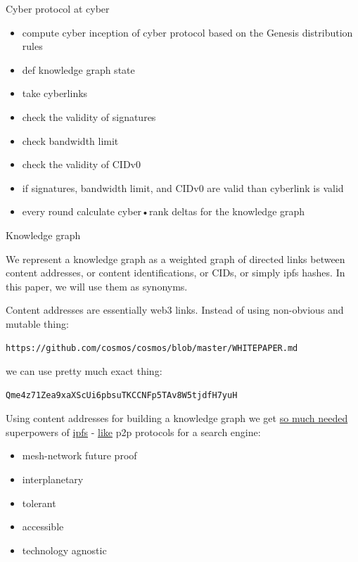 \documentclass[10pt,oneside]{amsart}
\makeatletter
\def\section{\@startsection{section}{1}%
  \z@{.7\linespacing\@plus\linespacing}{.5\linespacing}%
  {\normalfont\scshape}}%
\newenvironment{Figure}
  {\par\medskip\noindent\minipage{\linewidth}}
  {\endminipage\par\medskip}
\makeatother
\begin{document}
\section{Cyber protocol at cyber}\label{cyber protocol at cyber}

\begin{itemize}
\item compute cyber inception of cyber protocol based on the Genesis distribution rules
\item def knowledge graph state
\item take cyberlinks
\item check the validity of signatures
\item check bandwidth limit
\item check the validity of CIDv0
\item if signatures, bandwidth limit, and CIDv0 are valid than cyberlink is valid
\item every round calculate cyber•rank deltas for the knowledge graph
\end{itemize}

\section{Knowledge graph}\label{knowledge graph}
 
We represent a knowledge graph as a weighted graph of directed links between content addresses, or content identifications, or CIDs, or simply ipfs hashes. In this paper, we will use them as synonyms.


Content addresses are essentially web3 links. Instead of using non-obvious and mutable thing:
\begin{lstlisting}
https://github.com/cosmos/cosmos/blob/master/WHITEPAPER.md
\end{lstlisting}
we can use pretty much exact thing:
\begin{lstlisting}
Qme4z71Zea9xaXScUi6pbsuTKCCNFp5TAv8W5tjdfH7yuH
\end{lstlisting}
Using content addresses for building a knowledge graph we get 
\href{https://steemit.com/web3/@hipster/an-idea-of-decentralized-search-for-web3-ce860d61defe5est}{so much needed}
superpowers of 
 \href{https://ipfs.io/ipfs/QmV9tSDx9UiPeWExXEeH6aoDvmihvx6jD5eLb4jbTaKGps}{ipfs}
 - 
 \href{https://ipfs.io/ipfs/QmXHGmfo4sjdHVW2MAxczAfs44RCpSeva2an4QvkzqYgfR}{like} p2p protocols for a search engine:
\begin{itemize}
\item mesh-network future proof
\item interplanetary
\item tolerant
\item accessible
\item technology agnostic
\end{itemize}
\end{document}
